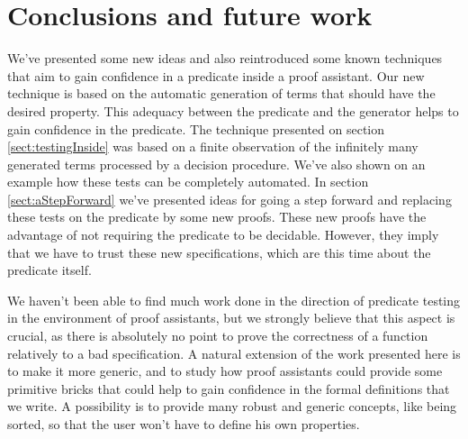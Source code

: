 \section{Conclusions and future work}


We've presented some new ideas and also reintroduced some known techniques that aim to gain confidence in a predicate inside a proof assistant. Our new technique is based on the automatic generation of terms that should have the desired property. This adequacy between the predicate and the generator helps to gain confidence in the predicate. The technique presented on section \ref{sect:testingInside} was based on a finite observation of the infinitely many generated terms processed by a decision procedure. We've also shown on an example how these tests can be completely automated. In section \ref{sect:aStepForward} we've presented ideas for going a step forward and replacing these tests on the predicate by some new proofs. These new proofs have the advantage of not requiring the predicate to be decidable. However, they imply that we have to trust these new specifications, which are this time about the predicate itself.

We haven't been able to find much work done in the direction of predicate testing in the environment of proof assistants, but we strongly believe that this aspect is crucial, as there is absolutely no point to prove the correctness of a function relatively to a bad specification. A natural extension of the work presented here is to make it more generic, and to study how proof assistants could provide some primitive bricks that could help to gain confidence in the formal definitions that we write. A possibility is to provide many robust and generic concepts, like being sorted, so that the user won't have to define his own properties. 